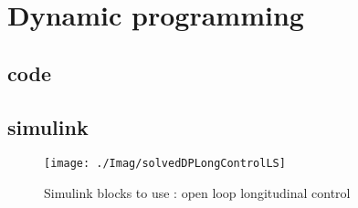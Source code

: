 \setcounter{chapter}{2}
\chapter{Dynamic programming}
\section{code}
	
	
	
	
	
	\begin{landscape}
\section{simulink}
	\begin{figure}[!h]
		\centering
		\texttt{[image: ./Imag/solvedDPLongControlLS]}
		\caption{Simulink blocks to use : open loop longitudinal control}
		\label {fig:NavFunSimulink}
	\end{figure}
	\end{landscape}






















